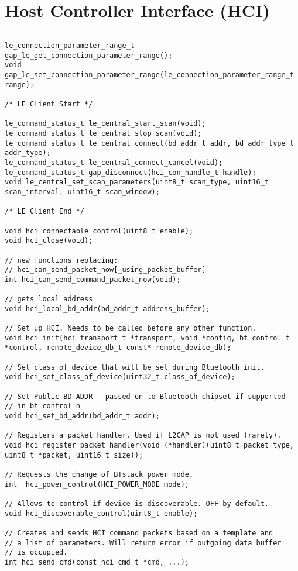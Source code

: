 \section{Host Controller Interface (HCI)}
\label{appendix:api_hci}
$ $
\begin{lstlisting}
le_connection_parameter_range_t gap_le_get_connection_parameter_range();
void gap_le_set_connection_parameter_range(le_connection_parameter_range_t range);

/* LE Client Start */

le_command_status_t le_central_start_scan(void);
le_command_status_t le_central_stop_scan(void);
le_command_status_t le_central_connect(bd_addr_t addr, bd_addr_type_t addr_type);
le_command_status_t le_central_connect_cancel(void);
le_command_status_t gap_disconnect(hci_con_handle_t handle);
void le_central_set_scan_parameters(uint8_t scan_type, uint16_t scan_interval, uint16_t scan_window);

/* LE Client End */
    
void hci_connectable_control(uint8_t enable);
void hci_close(void);

// new functions replacing: 
// hci_can_send_packet_now[_using_packet_buffer]
int hci_can_send_command_packet_now(void);
    
// gets local address 
void hci_local_bd_addr(bd_addr_t address_buffer);

// Set up HCI. Needs to be called before any other function.
void hci_init(hci_transport_t *transport, void *config, bt_control_t *control, remote_device_db_t const* remote_device_db);

// Set class of device that will be set during Bluetooth init.
void hci_set_class_of_device(uint32_t class_of_device);

// Set Public BD ADDR - passed on to Bluetooth chipset if supported 
// in bt_control_h
void hci_set_bd_addr(bd_addr_t addr);

// Registers a packet handler. Used if L2CAP is not used (rarely). 
void hci_register_packet_handler(void (*handler)(uint8_t packet_type, uint8_t *packet, uint16_t size));

// Requests the change of BTstack power mode.
int  hci_power_control(HCI_POWER_MODE mode);

// Allows to control if device is discoverable. OFF by default.
void hci_discoverable_control(uint8_t enable);

// Creates and sends HCI command packets based on a template and 
// a list of parameters. Will return error if outgoing data buffer 
// is occupied. 
int hci_send_cmd(const hci_cmd_t *cmd, ...);


\end{lstlisting}
